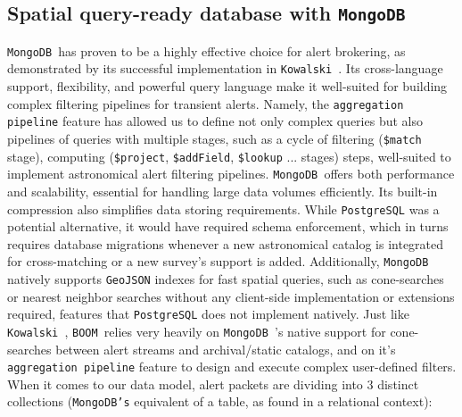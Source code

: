 \documentclass[twocolumn]{aastex631}
\newcommand{\boom}{\texttt{BOOM }}
\newcommand{\kowalski}{\texttt{Kowalski }}
\newcommand{\mongo}{\texttt{MongoDB }}
\begin{document}
\subsection{Spatial query-ready database with \mongo}

\mongo has proven to be a highly effective choice for alert brokering, as demonstrated by its successful implementation in \kowalski. Its cross-language support, flexibility, and powerful query language make it well-suited for building complex filtering pipelines for transient alerts. Namely, the \texttt{aggregation pipeline} feature has allowed us to define not only complex queries but also pipelines of queries with multiple stages,
such as a cycle of filtering
(\texttt{\$match} stage),
computing (\texttt{\$project}, \texttt{\$addField}, \texttt{\$lookup} ... stages) steps,
well-suited to implement astronomical alert filtering pipelines. \mongo offers both performance and scalability, essential for handling large data volumes efficiently. Its built-in compression also simplifies data storing requirements.
While \texttt{PostgreSQL} was a potential alternative,
it would have required schema enforcement, which in turns requires database migrations whenever a new astronomical catalog is integrated for cross-matching or a new survey's support is added.
Additionally, \mongo natively supports \texttt{GeoJSON} indexes for fast spatial queries, such as cone-searches or nearest neighbor searches without any client-side implementation or extensions required, features that \texttt{PostgreSQL} does not implement natively.
Just like \kowalski, \boom relies very heavily on \mongo's native support for cone-searches between alert streams and archival/static catalogs, and on it's \texttt{aggregation pipeline} feature to design and execute complex user-defined filters. When it comes to our data model, alert packets are dividing into 3 distinct collections (\texttt{MongoDB's} equivalent of a table, as found in a relational context):
\end{document}
